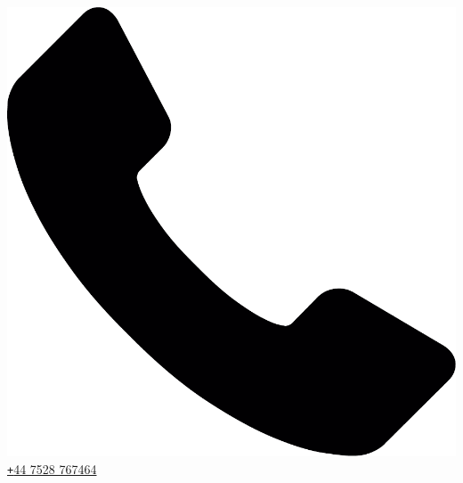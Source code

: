 \documentclass[10pt]{article} %
\begin{document}
{  \includegraphics[scale=0.018]{telephone5.pdf}
  \href{tel:+85268260957}{\texttt{+}44 7528 767464}
}

\end{document}
